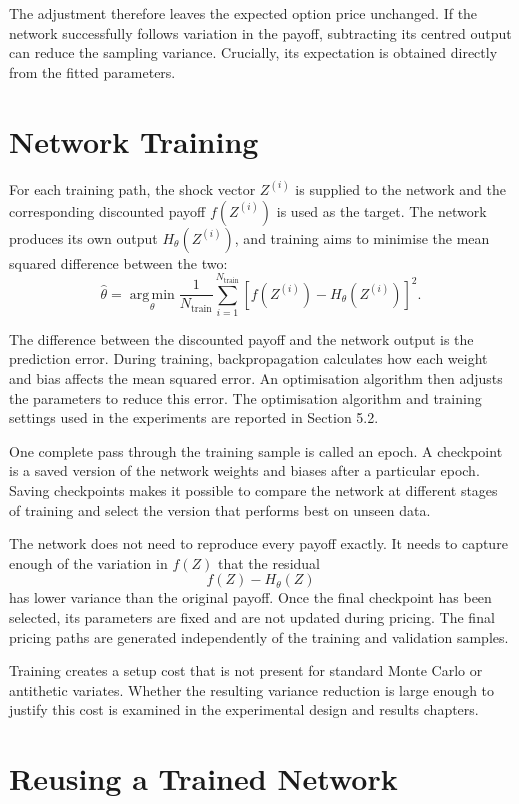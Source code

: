 The adjustment therefore leaves the expected option price unchanged. If the network successfully follows variation in the payoff, subtracting its centred output can reduce the sampling variance. Crucially, its expectation is obtained directly from the fitted parameters.

\section{Network Training}
\label{sec:network-training}

For each training path, the shock vector \(Z^{(i)}\) is supplied to the network and the corresponding discounted payoff \(f(Z^{(i)})\) is used as the target. The network produces its own output \(H_\theta(Z^{(i)})\), and training aims to minimise the mean squared difference between the two:
\[
\widehat{\theta}
=
\underset{\theta}{\operatorname{arg\,min}}
\frac{1}{N_{\mathrm{train}}}
\sum_{i=1}^{N_{\mathrm{train}}}
\left[
f\left(Z^{(i)}\right)
-
H_\theta\left(Z^{(i)}\right)
\right]^2.
\]

The difference between the discounted payoff and the network output is the prediction error. During training, backpropagation calculates how each weight and bias affects the mean squared error. An optimisation algorithm then adjusts the parameters to reduce this error. The optimisation algorithm and training settings used in the experiments are reported in Section 5.2.

One complete pass through the training sample is called an epoch. A checkpoint is a saved version of the network weights and biases after a particular epoch. Saving checkpoints makes it possible to compare the network at different stages of training and select the version that performs best on unseen data.

The network does not need to reproduce every payoff exactly. It needs to capture enough of the variation in \(f(Z)\) that the residual
\[
f(Z)-H_\theta(Z)
\]
has lower variance than the original payoff. Once the final checkpoint has been selected, its parameters are fixed and are not updated during pricing. The final pricing paths are generated independently of the training and validation samples.

Training creates a setup cost that is not present for standard Monte Carlo or antithetic variates. Whether the resulting variance reduction is large enough to justify this cost is examined in the experimental design and results chapters.

\section{Reusing a Trained Network}
\label{sec:reusing-trained-network}

